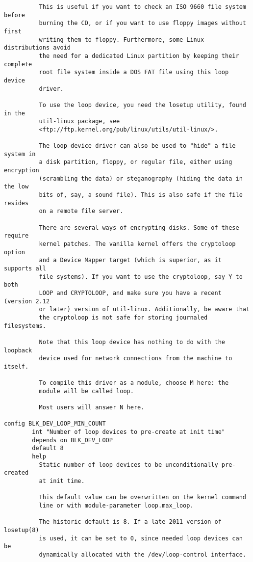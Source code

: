 \documentclass[journal,10pt,onecolumn,compsoc,letterpaper,draftclsnofoot,table,xcdraw]{IEEEtran} \usepackage[margin=0.75in]{geometry}
\begin{document}
\begin{verbatim}
          This is useful if you want to check an ISO 9660 file system before
          burning the CD, or if you want to use floppy images without first
          writing them to floppy. Furthermore, some Linux distributions avoid
          the need for a dedicated Linux partition by keeping their complete
          root file system inside a DOS FAT file using this loop device
          driver.

          To use the loop device, you need the losetup utility, found in the
          util-linux package, see
          <ftp://ftp.kernel.org/pub/linux/utils/util-linux/>.

          The loop device driver can also be used to "hide" a file system in
          a disk partition, floppy, or regular file, either using encryption
          (scrambling the data) or steganography (hiding the data in the low
          bits of, say, a sound file). This is also safe if the file resides
          on a remote file server.

          There are several ways of encrypting disks. Some of these require
          kernel patches. The vanilla kernel offers the cryptoloop option
          and a Device Mapper target (which is superior, as it supports all
          file systems). If you want to use the cryptoloop, say Y to both
          LOOP and CRYPTOLOOP, and make sure you have a recent (version 2.12
          or later) version of util-linux. Additionally, be aware that
          the cryptoloop is not safe for storing journaled filesystems.

          Note that this loop device has nothing to do with the loopback
          device used for network connections from the machine to itself.

          To compile this driver as a module, choose M here: the
          module will be called loop.

          Most users will answer N here.

config BLK_DEV_LOOP_MIN_COUNT
        int "Number of loop devices to pre-create at init time"
        depends on BLK_DEV_LOOP
        default 8
        help
          Static number of loop devices to be unconditionally pre-created
          at init time.

          This default value can be overwritten on the kernel command
          line or with module-parameter loop.max_loop.

          The historic default is 8. If a late 2011 version of losetup(8)
          is used, it can be set to 0, since needed loop devices can be
          dynamically allocated with the /dev/loop-control interface.


\end{verbatim}
\end{document}
